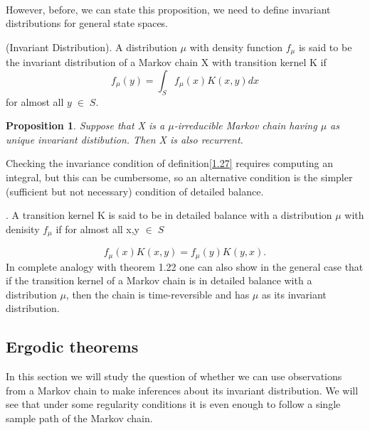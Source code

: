 \documentclass[a4paper,10pt]{article}
\newtheorem{proposition}[theorem]{Proposition}
\newenvironment{definition}[1][Definition]{\begin{trivlist}
\item[\hskip \labelsep {\bfseries #1}]}{\end{trivlist}}
\begin{document}
     \paragraph{} However, before, we can state this proposition, we need to define invariant distributions for
     general state spaces. 
     \begin{definition}\label{1.27}
      (Invariant Distribution). A distribution $\mu$ with density function $f_{\mu}$ is said to be the invariant
      distribution of a Markov chain X with transition kernel K if 
      \begin{equation*}
       f_{\mu} (y) = \int_{S} f_{\mu} (x) K(x,y) dx
      \end{equation*}
for almost all $y \;\in\;S.$
     \end{definition}
\begin{proposition}
 Suppose that X is a $\mu$-irreducible Markov chain having $\mu$ as unique invariant distibution. Then
 X is also recurrent.
\end{proposition}
Checking the invariance condition of definition\ref{1.27} requires computing an integral, but this can be cumbersome,
so an alternative condition is the simpler (sufficient but not necessary) condition of detailed balance.
\begin{definition}[Detailed balance].
 A transition kernel K is said to be in detailed balance with a distribution $\mu$ with denisity $f_{\mu}$ if for
 almost all x,y $\in\;S$
 \end{definition}
 \begin{equation*}
  f_{\mu}(x)K(x,y) = f_{\mu}(y)K(y,x).
 \end{equation*}
In complete analogy with theorem 1.22 one can also show in the general case that if the transition kernel of a Markov
chain is in detailed balance with a distribution $\mu$, then the chain is time-reversible and has $\mu$ as its 
invariant
distribution. 
\subsection{Ergodic theorems}
In this section we will study the question of whether we can use observations from a Markov chain to make inferences
about its invariant distribution. We will see that under some regularity conditions it is even enough to 
follow a single
sample path of the Markov chain. 
\end{document}
